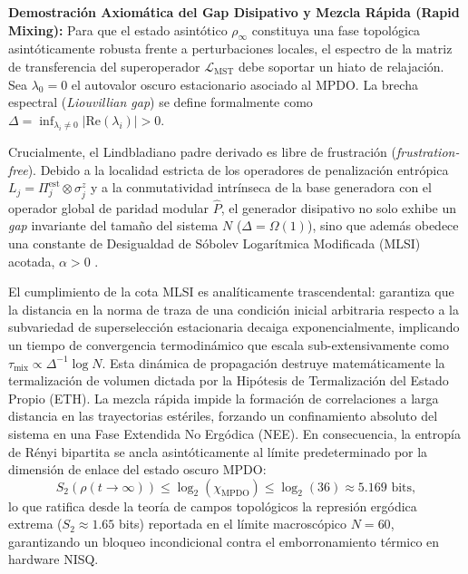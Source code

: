 \documentclass[12pt,a4paper]{article}
\theoremstyle{plain}
\theoremstyle{definition}
\theoremstyle{remark}
\begin{document}
\textbf{Demostración Axiomática del Gap Disipativo y Mezcla Rápida (Rapid Mixing):}
Para que el estado asintótico $\rho_\infty$ constituya una fase topológica asintóticamente robusta frente a perturbaciones locales, el espectro de la matriz de transferencia del superoperador $\mathcal{L}_{\text{MST}}$ debe soportar un hiato de relajación. Sea $\lambda_0 = 0$ el autovalor oscuro estacionario asociado al MPDO. La brecha espectral (\textit{Liouvillian gap}) se define formalmente como $\Delta = \inf_{\lambda_i \neq 0} |\text{Re}(\lambda_i)| > 0$.

Crucialmente, el Lindbladiano padre derivado es libre de frustración (\textit{frustration-free}). Debido a la localidad estricta de los operadores de penalización entrópica $L_j = \Pi_j^{\text{est}} \otimes \sigma_j^z$ y a la conmutatividad intrínseca de la base generadora con el operador global de paridad modular $\hat{P}$, el generador disipativo no solo exhibe un \textit{gap} invariante del tamaño del sistema $N$ ($\Delta = \Omega(1)$), sino que además obedece una constante de Desigualdad de Sóbolev Logarítmica Modificada (MLSI) acotada, $\alpha > 0$ \cite{Kastoryano2013}.

El cumplimiento de la cota MLSI es analíticamente trascendental: garantiza que la distancia en la norma de traza de una condición inicial arbitraria respecto a la subvariedad de superselección estacionaria decaiga exponencialmente, implicando un tiempo de convergencia termodinámico que escala sub-extensivamente como $\tau_{\text{mix}} \propto \Delta^{-1} \log N$.
Esta dinámica de propagación destruye matemáticamente la termalización de volumen dictada por la Hipótesis de Termalización del Estado Propio (ETH). La mezcla rápida impide la formación de correlaciones a larga distancia en las trayectorias estériles, forzando un confinamiento absoluto del sistema en una Fase Extendida No Ergódica (NEE). En consecuencia, la entropía de Rényi bipartita se ancla asintóticamente al límite predeterminado por la dimensión de enlace del estado oscuro MPDO:
\begin{equation}
S_2(\rho(t \to \infty)) \le \log_2(\chi_{\text{MPDO}}) \le \log_2(36) \approx 5.169 \text{ bits},
\end{equation}
lo que ratifica desde la teoría de campos topológicos la represión ergódica extrema ($S_2 \approx 1.65$ bits) reportada en el límite macroscópico $N=60$, garantizando un bloqueo incondicional contra el emborronamiento térmico en hardware NISQ.
\end{document}
